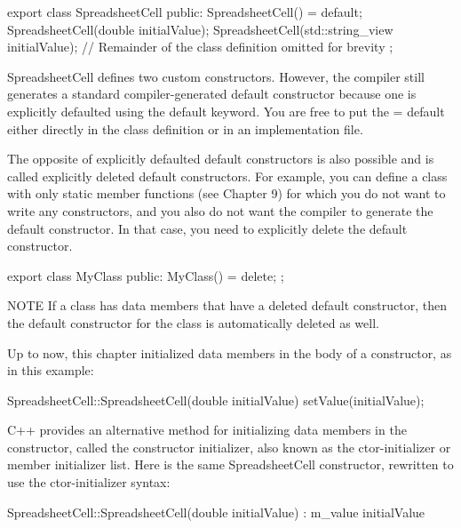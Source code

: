 \begin{cpp}
export class SpreadsheetCell
{
    public:
        SpreadsheetCell() = default;
        SpreadsheetCell(double initialValue);
        SpreadsheetCell(std::string_view initialValue);
        // Remainder of the class definition omitted for brevity
};
\end{cpp}

SpreadsheetCell defines two custom constructors. However, the compiler still generates a standard compiler-generated default constructor because one is explicitly defaulted using the default keyword. You are free to put the = default either directly in the class definition or in an implementation file.


The opposite of explicitly defaulted default constructors is also possible and is called explicitly deleted default constructors. For example, you can define a class with only static member functions (see Chapter 9) for which you do not want to write any constructors, and you also do not want the compiler to generate the default constructor. In that case, you need to explicitly delete the default constructor.

\begin{cpp}
export class MyClass
{
    public:
        MyClass() = delete;
};
\end{cpp}

\begin{myNotic}{NOTE}
If a class has data members that have a deleted default constructor, then the default constructor for the class is automatically deleted as well.
\end{myNotic}


Up to now, this chapter initialized data members in the body of a constructor, as in this example:

\begin{cpp}
SpreadsheetCell::SpreadsheetCell(double initialValue)
{
    setValue(initialValue);
}
\end{cpp}

C++ provides an alternative method for initializing data members in the constructor, called the constructor initializer, also known as the ctor-initializer or member initializer list. Here is the same SpreadsheetCell constructor, rewritten to use the ctor-initializer syntax:

\begin{cpp}
SpreadsheetCell::SpreadsheetCell(double initialValue)
: m_value { initialValue }
{}
\end{cpp}

